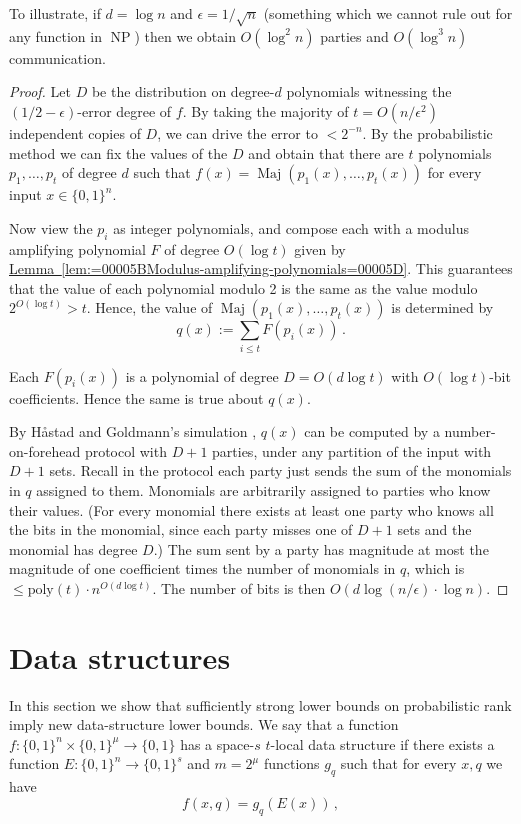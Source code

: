 \documentclass[11pt]{article}
\newcommand{\expref}[2]{\texorpdfstring{\hyperref[#2]{#1~\ref{#2}}}{#1~\ref{#2}}}
\DeclareMathOperator{\Maj}{\mathrm{Maj}}  %
\DeclareMathOperator{\NP}{\mathrm{NP}}  %
\newcommand{\zo}{\{0, 1\}}
\newcommand{\poly}{\mathrm{poly}}
\newcommand{\e}{\epsilon}
\begin{document}
To illustrate, if $d=\log n$ and $\e=1/\sqrt{n}$ (something which
we cannot rule out for any function in $\NP$) then we obtain $O(\log^{2}n)$
parties and $O(\log^{3}n)$ communication.
\begin{proof}
Let $D$ be the distribution on degree-$d$ polynomials witnessing
the $(1/2-\e)$-error degree of $f$. By taking the majority of $t=O(n/\e^{2})$
independent copies of $D$, we can drive the error to $<2^{-n}$.
By the probabilistic method we can fix the values of the $D$ and
obtain that there are $t$ polynomials $p_{1},\ldots,p_{t}$ of degree
$d$ such that $f(x)=\Maj(p_{1}(x),\ldots,p_{t}(x))$ for every input
$x\in\zo^{n}$.

Now view the $p_{i}$ as integer polynomials, and compose each with
a modulus amplifying polynomial $F$ of degree $O(\log t)$ given
by \expref{Lemma}{lem:=00005BModulus-amplifying-polynomials=00005D}.
This guarantees that the value of each polynomial modulo 2 is the
same as the value modulo $2^{O(\log t)}>t$. Hence, the value of
$\Maj(p_{1}(x),\ldots,p_{t}(x))$
is determined by
\[
q(x):=\sum_{i\le t}F(p_{i}(x))\,.
\]

Each $F(p_{i}(x))$ is a polynomial of degree $D=O(d\log t)$ with
$O(\log t)$-bit coefficients. Hence the same is true about $q(x)$.

By %
H{\aa}stad  %
and Goldmann's simulation \cite{HaG91}, $q(x)$ can be
computed by a number-on-forehead protocol with $D+1$ parties, under
any partition of the input with $D+1$ sets. Recall in the protocol
each party just sends the sum of the monomials in $q$ assigned to
them. Monomials are arbitrarily assigned to parties who know their
values. (For every monomial there exists at least one party who knows
all the bits in the monomial, since each party misses one of $D+1$
sets and the monomial has degree $D$.) The sum sent by a party has
magnitude at most the magnitude of one coefficient times the number
of monomials in $q$, which is $\le\poly(t)\cdot n^{O(d\log t)}$.
The number of bits is then $O(d\log(n/\e)\cdot\log n)$.
\end{proof}

\section{Data structures \label{sec:Data-structures}}

In this section we show that sufficiently strong lower bounds on probabilistic
rank imply new data-structure lower bounds. We say that a function
$f:\zo^{n}\times\zo^{\mu}\to\zo$ has a space-$s$ $t$-local data
structure if there exists a function $E:\zo^{n}\to\zo^{s}$ and $m=2^{\mu}$
functions $g_{q}$ such that for every $x,q$ we have
\[
f(x,q)=g_{q}(E(x))\,,
\]
\end{document}
